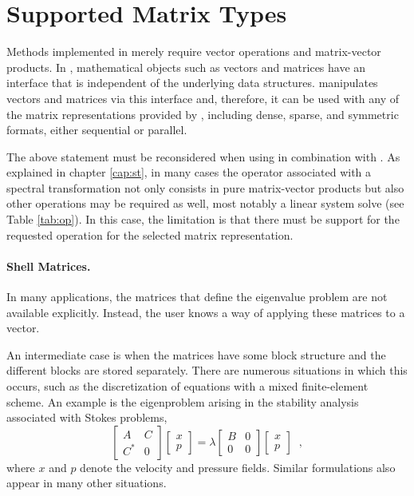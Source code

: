\section{Supported Matrix Types}
\label{sec:supported}

	Methods implemented in  merely require vector operations and matrix-vector products. In \petsc, mathematical objects such as vectors and matrices have an interface that is independent of the underlying data structures. \slepc manipulates vectors and matrices via this interface and, therefore, it can be used with any of the matrix representations provided by \petsc, including dense, sparse, and symmetric formats, either sequential or parallel.

	The above statement must be reconsidered when using  in combination with . As explained in chapter \ref{cap:st}, in many cases the operator associated with a spectral transformation not only consists in pure matrix-vector products but also other operations may be required as well, most notably a linear system solve (see Table \ref{tab:op}). In this case, the limitation is that there must be support for the requested operation for the selected matrix representation. %

\paragraph{Shell Matrices.}

	In many applications, the matrices that define the eigenvalue problem are not available explicitly. Instead, the user knows a way of applying these matrices to a vector.

	An intermediate case is when the matrices have some block structure and the different blocks are stored separately. There are numerous situations in which this occurs, such as the discretization of equations with a mixed finite-element scheme. An example is the eigenproblem arising in the stability analysis associated with Stokes problems,
\begin{equation}
\begin{bmatrix}A & C\\C^* & 0\end{bmatrix}\begin{bmatrix}x\\p\end{bmatrix}
=\lambda\begin{bmatrix}B & 0\\0 & 0\end{bmatrix}\begin{bmatrix}x\\p\end{bmatrix}\;\;,
\end{equation}
where $x$ and $p$ denote the velocity and pressure fields. Similar formulations also appear in many other situations.


